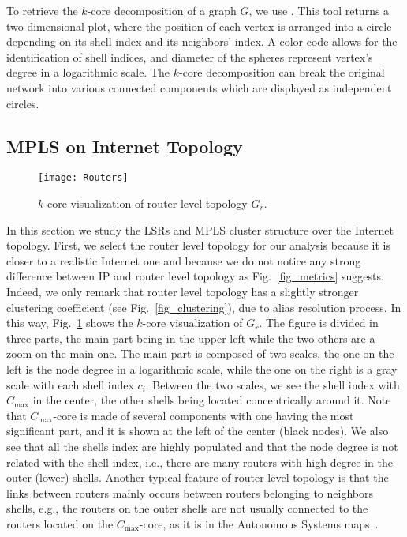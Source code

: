 To retrieve the $k$-core decomposition of a graph $G$, we use
\lanet\cite{Alvarez06k}. This tool returns a two dimensional plot, where the
position of each vertex is arranged into a circle depending on its shell index
and its neighbors' index. A color code allows for the identification of shell
indices, and diameter of the spheres represent vertex's degree in a logarithmic
scale. The $k$-core decomposition can break the original network into various
connected components which are displayed as independent circles.

\subsection{MPLS on Internet Topology}\label{cluster.topo}
\begin{figure}[!t]
  \begin{center}
    \texttt{[image: Routers]}
  \end{center}
  \caption{$k$-core visualization of router level topology $G_{r}$.}
  \label{fig_k_core_routers}
\end{figure}

In this section we study the LSRs and MPLS cluster structure over the Internet
topology.  First, we select the router level topology for our analysis because
it is closer to a realistic Internet one and because we do not notice any strong
difference between IP and router level topology as Fig.~\ref{fig_metrics}
suggests. Indeed, we only remark that router level topology has a slightly
stronger clustering coefficient (see Fig.~\ref{fig_clustering}), due to alias
resolution process. In this way, Fig.~\ref{fig_k_core_routers} shows the
$k$-core visualization of $G_{r}$.  The figure is divided in three parts, the
main part being in the upper left while the two others are a zoom on the main
one.  The main part is composed of two scales, the one on the left is the node
degree in a logarithmic scale, while the one on the right is a gray scale with
each shell index $c_i$. Between the two scales, we see the shell index with
$C_{\max}$ in the center, the other shells being located concentrically around
it. Note that $C_{\max}$-core is made of several components with one having the
most significant part, and it is shown at the left of the center (black nodes).
We also see that all the shells index are highly populated and that the node
degree is not related with the shell index, i.e., there are many routers with
high degree in the outer (lower) shells. Another typical feature of router level
topology is that the links between routers mainly occurs between routers
belonging to neighbors shells, e.g., the routers on the outer shells are not
usually connected to the routers located on the  $C_{\max}$-core, as it is in
the Autonomous Systems maps~\cite{Alvarez06k}.

